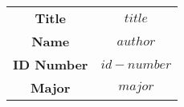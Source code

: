 
\begin{table}[ht]
\centering
\setlength{\tabcolsep}{1mm}
    \begin{tabular}{cc}
    \textbf{Title} & $title$ \\

    \textbf{Name} & $author$ \\
    
    \textbf{ID Number} & $id-number$ \\
    
    \textbf{Major} & $major$ \\
    \end{tabular}
\end{table}
